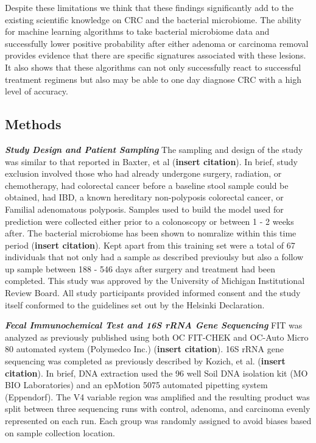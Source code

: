 \documentclass[12pt,]{article}
\begin{document}
Despite these limitations we think that these findings significantly add
to the existing scientific knowledge on CRC and the bacterial
microbiome. The ability for machine learning algorithms to take
bacterial microbiome data and successfully lower positive probability
after either adenoma or carcinoma removal provides evidence that there
are specific signatures associated with these lesions. It also shows
that these algorithms can not only successfully react to successful
treatment regimens but also may be able to one day diagnose CRC with a
high level of accuracy.

\newpage

\subsection{Methods}\label{methods}

\textbf{\emph{Study Design and Patient Sampling}} The sampling and
design of the study was similar to that reported in Baxter, et al
(\textbf{insert citation}). In brief, study exclusion involved those who
had already undergone surgery, radiation, or chemotherapy, had
colorectal cancer before a baseline stool sample could be obtained, had
IBD, a known hereditary non-polyposis colorectal cancer, or Familial
adenomatous polyposis. Samples used to build the model used for
prediction were collected either prior to a colonoscopy or between 1 - 2
weeks after. The bacterial microbiome has been shown to nomralize within
this time period (\textbf{insert citation}). Kept apart from this
training set were a total of 67 individuals that not only had a sample
as described previoulsy but also a follow up sample between 188 - 546
days after surgery and treatment had been completed. This study was
approved by the University of Michigan Institutional Review Board. All
study participants provided informed consent and the study itself
conformed to the guidelines set out by the Helsinki Declaration.

\textbf{\emph{Fecal Immunochemical Test and 16S rRNA Gene Sequencing}}
FIT was analyzed as previously published using both OC FIT-CHEK and
OC-Auto Micro 80 automated system (Polymedco Inc.) (\textbf{insert
citation}). 16S rRNA gene sequencing was completed as previously
described by Kozich, et al. (\textbf{insert citation}). In brief, DNA
extraction used the 96 well Soil DNA isolation kit (MO BIO Laboratories)
and an epMotion 5075 automated pipetting system (Eppendorf). The V4
variable region was amplified and the resulting product was split
between three sequencing runs with control, adenoma, and carcinoma
evenly represented on each run. Each group was randomly assigned to
avoid biases based on sample collection location.
\end{document}
